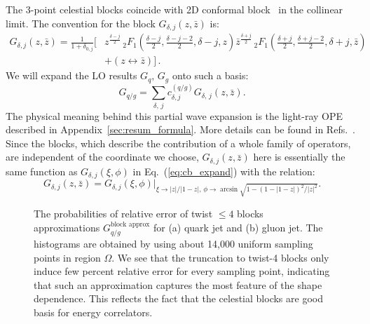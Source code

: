 \documentclass[letterpaper,11pt]{article}
\def\beq{\begin{equation}}
\def\eeq{\end{equation}}
\def\App#1{Appendix~\ref{#1}}
\def\to{\rightarrow}
\DeclareRobustCommand{\App}[1]{App.~\ref{#1}}
\DeclareRobustCommand{\Eq}[1]{Eq.~(\ref{#1})}
\DeclareRobustCommand{\Refs}[1]{Refs.~\cite{#1}}
\begin{document}
The 3-point celestial blocks coincide with 2D conformal block~\cite{Dolan:2000ut} in the collinear limit.
%
The convention for the block $G_{\delta,j}(z,\bar{z})$ is:
%
\begin{align}
\nonumber
G_{\delta,j}(z,\bar{z}) =\frac{1}{1+\delta_{0,j}} \Bigg[ &z^{\frac{\delta-j}{2}} \,_2F_1\left(\frac{\delta-j}{2}, \frac{\delta-j-2}{2}, \delta-j, z\right)
\bar{z}^{\frac{\delta+j}{2}} \,_2F_1\left(\frac{\delta+j}{2}, \frac{\delta+j-2}{2}, \delta+j, \bar{z}\right)
 \\
&
+ (z\leftrightarrow \bar{z})\Bigg] \,.
\end{align}
%
We will expand the LO results $G_q,\, G_g$  onto such a basis:
\begin{equation}
G_{q/g} = \sum_{\delta,\,j} c_{\delta,j}^{(q/g)} G_{\delta,\,j}(z,\bar{z}).
\end{equation}
%
The physical meaning behind this partial wave expansion is the light-ray OPE described in \App{sec:resum_formula}.
%
More details can be found in \Refs{Chang:2022ryc,Chen:2022jhb}.
%
Since the blocks, which describe the contribution of a whole family of operators, are independent of the coordinate we choose, $G_{\delta,j}(z,\bar{z})$ here is essentially the same function as $G_{\delta,j}(\xi,\phi)$ in \Eq{eq:cb_expand} with the relation:
\beq
G_{\delta,j}(z,\bar{z}) = G_{\delta,j}(\xi,\phi)\Big|_{\xi\to|z|/|1-z|,\,\phi\to \arcsin \sqrt{1-\left(1-|1-z|\right)^2/|z|^2}}.
\eeq
%




\begin{figure}[t]
\begin{center}
\qquad\quad
%
\caption{
The probabilities of relative error of twist $\leq 4$ blocks approximations $G_{q/g}^{\text{block approx}} $ for (a) quark jet and (b) gluon jet. The histograms are obtained by using about 14,000 uniform sampling points in region $\Omega$. We see that the truncation to twist-4 blocks only induce few percent relative error for every sampling point, indicating that such an approximation captures the most feature of the shape dependence. This reflects the fact that the celestial blocks are good basis for energy correlators.}
\label{fig:block_approx_error}
\end{center}
\end{figure}
\end{document}
